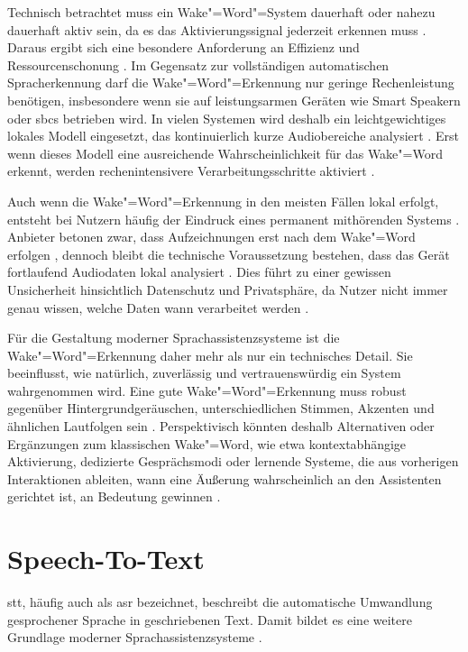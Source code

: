 Technisch betrachtet muss ein Wake"=Word"=System dauerhaft oder nahezu dauerhaft aktiv sein, da es das Aktivierungssignal jederzeit erkennen muss \autocite{voiceassistantIntroduction,tiredWakeWords}. Daraus ergibt sich eine besondere Anforderung an Effizienz und Ressourcenschonung \autocite{voiceassistantIntroduction}. Im Gegensatz zur vollständigen automatischen Spracherkennung darf die Wake"=Word"=Erkennung nur geringe Rechenleistung benötigen, insbesondere wenn sie auf leistungsarmen Geräten wie Smart Speakern oder \glspl{sbc} betrieben wird.
In vielen Systemen wird deshalb ein leichtgewichtiges lokales Modell eingesetzt, das kontinuierlich kurze Audiobereiche analysiert \autocite{voiceassistantIntroduction}. Erst wenn dieses Modell eine ausreichende Wahrscheinlichkeit für das Wake"=Word erkennt, werden rechenintensivere Verarbeitungsschritte aktiviert \autocite{tiredWakeWords}.

Auch wenn die Wake"=Word"=Erkennung  in den meisten Fällen lokal erfolgt, entsteht bei Nutzern häufig der Eindruck eines permanent mithörenden Systems \autocite{tiredWakeWords,EDPBLeitlinienSprachassistenzsysteme}. Anbieter betonen zwar, dass Aufzeichnungen erst nach dem Wake"=Word erfolgen \autocite{DataPrivacyAmazonEcho, DataPrivacyGoogleHome, DataPrivacyGoogleNest, DataPrivacySiri}, dennoch bleibt die technische Voraussetzung bestehen, dass das Gerät fortlaufend Audiodaten lokal analysiert \autocite{tiredWakeWords,EDPBLeitlinienSprachassistenzsysteme}. Dies führt zu einer gewissen Unsicherheit hinsichtlich Datenschutz und Privatsphäre, da Nutzer nicht immer genau wissen, welche Daten wann verarbeitet werden \autocite{tiredWakeWords}.

Für die Gestaltung moderner Sprachassistenzsysteme ist die Wake"=Word"=Erkennung daher mehr als nur ein technisches Detail. Sie beeinflusst, wie natürlich, zuverlässig und vertrauenswürdig ein System wahrgenommen wird. Eine gute Wake"=Word"=Erkennung muss robust gegenüber Hintergrundgeräuschen, unterschiedlichen Stimmen, Akzenten und ähnlichen Lautfolgen sein \autocite{tiredWakeWords}. Perspektivisch könnten deshalb Alternativen oder Ergänzungen zum klassischen Wake"=Word, wie etwa kontextabhängige Aktivierung, dedizierte Gesprächsmodi oder lernende Systeme, die aus vorherigen Interaktionen ableiten, wann eine Äußerung wahrscheinlich an den Assistenten gerichtet ist, an Bedeutung gewinnen \autocite{voiceassistantIntroduction}.


\section{Speech-To-Text}
\label{sec:Speech-To-Text}
\gls{stt}, häufig auch als \gls{asr} bezeichnet, beschreibt die automatische Umwandlung gesprochener Sprache in geschriebenen Text. Damit bildet es eine weitere Grundlage moderner Sprachassistenzsysteme \autocite{speechtoTextTexttoSpeechRecognition}.

